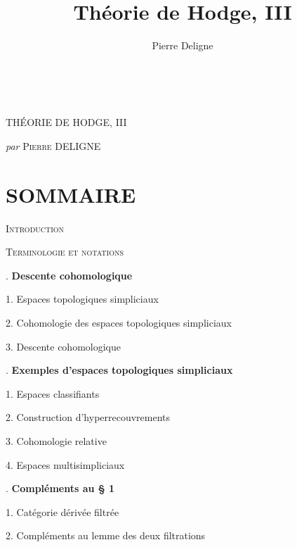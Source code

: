 \documentclass[11pt,leqno]{article}
\title{Théorie de Hodge, III}
\author{Pierre Deligne}
\date{}
\newcommand{\Page}[1]{\ifvmode\noindent\else\unskip\ \fi{\footnotesize\textcolor{gray}{[p.\,#1]}}\ \ignorespaces}
\begin{document}
\maketitle
\Page{5}

\begin{center}
{\Large THÉORIE DE HODGE, III\par}
\medskip
{\large \textit{par} \textsc{Pierre} DELIGNE\par}
\end{center}

\section*{\centering\normalfont SOMMAIRE}

\begingroup
\small
\noindent\textsc{Introduction}\par
\medskip
\noindent\textsc{Terminologie et notations}\par
\medskip
{}. \textbf{Descente cohomologique}\par
\noindent\hspace*{1.5em}1. Espaces topologiques simpliciaux\par
\noindent\hspace*{1.5em}2. Cohomologie des espaces topologiques simpliciaux\par
\noindent\hspace*{1.5em}3. Descente cohomologique\par
\medskip
{}. \textbf{Exemples d’espaces topologiques simpliciaux}\par
\noindent\hspace*{1.5em}1. Espaces classifiants\par
\noindent\hspace*{1.5em}2. Construction d’hyperrecouvrements\par
\noindent\hspace*{1.5em}3. Cohomologie relative\par
\noindent\hspace*{1.5em}4. Espaces multisimpliciaux\par
\medskip
{}. \textbf{Compléments au § 1}\par
\noindent\hspace*{1.5em}1. Catégorie dérivée filtrée\par
\noindent\hspace*{1.5em}2. Compléments au lemme des deux filtrations\par
\end{document}
